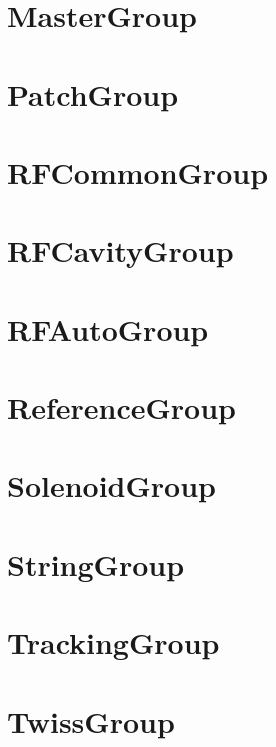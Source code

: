 \section{MasterGroup}
\label{s:master.g}

\section{PatchGroup}
\label{s:patch.g}

\section{RFCommonGroup}
\label{s:rfcommon.g}

\section{RFCavityGroup}
\label{s:rfcavity.g}

\section{RFAutoGroup}
\label{s:rfauto.g}

\section{ReferenceGroup}
\label{s:reference.g}

\section{SolenoidGroup}
\label{s:solenoid.g}

\section{StringGroup}
\label{s:string.g}

\section{TrackingGroup}
\label{s:tracking.g}

\section{TwissGroup}
\label{s:twiss.g}


